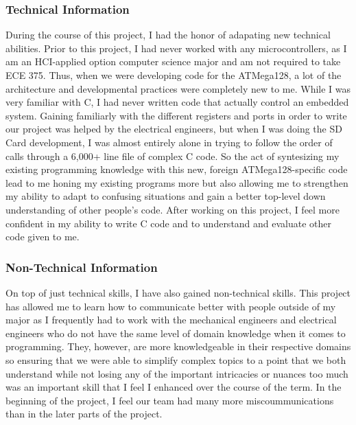 \subsubsection{Technical Information}
During the course of this project, I had the honor of adapating new technical abilities. Prior to this project,
I had never worked with any microcontrollers, as I am an HCI-applied option computer science major and am not required to take
ECE 375. Thus, when we were developing code for the ATMega128, a lot of the architecture and developmental practices
were completely new to me. While I was very familiar with C, I had never written code that actually control an embedded system.
Gaining familiarly with the different registers and ports in order to write our project was helped by the electrical engineers,
 but when I was doing the
SD Card development, I was almost entirely alone in trying to follow the order of calls through a 6,000+ line file of complex C code.
So the act of syntesizing my existing programming knowledge with this new, foreign ATMega128-specific code lead to me honing my existing
programs more but also allowing me to strengthen my ability to adapt to confusing situations and gain a better top-level down
understanding of other people's code. After working on this project, I feel more confident in my ability to write C code and 
to understand and evaluate other code given to me.

\subsubsection{Non-Technical Information}
On top of just technical skills, I have also gained non-technical skills. This project has allowed me to learn how to communicate
better with people outside of my major as I frequently had to work with the mechanical engineers and electrical engineers who do not
have the same level of domain knowledge when it comes to programming. They, however, are more knowledgeable in their respective domains
so ensuring that we were able to simplify complex topics to a point that we both understand while not losing any of the important
intricacies or nuances too much was an important skill that I feel I enhanced over the course of the term. In the beginning of the 
project, I feel our team had many more miscoummunications than in the later parts of the project.

